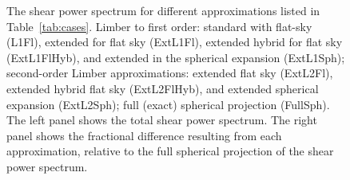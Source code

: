 \documentclass[fleqn,usenatbib]{mnras} %
\begin{document}
\begin{figure}

  \begin{center}
  \end{center}

  \caption{\label{fig:Cl_cases}The shear power spectrum for different approximations listed in Table~\ref{tab:cases}. Limber to first order: standard with flat-sky (L1Fl),
        extended for flat sky (ExtL1Fl), extended hybrid for flat sky (ExtL1FlHyb),
        and extended in the spherical expansion (ExtL1Sph);
        second-order Limber approximations: extended flat sky (ExtL2Fl), extended hybrid flat sky (ExtL2FlHyb),
        and extended spherical expansion (ExtL2Sph); full (exact) spherical projection (FullSph).
        The left panel shows the total shear power spectrum.  The right panel shows the fractional difference resulting from each approximation, 
        relative to the full spherical projection of the shear power spectrum.
        }
\end{figure}
\end{document}
